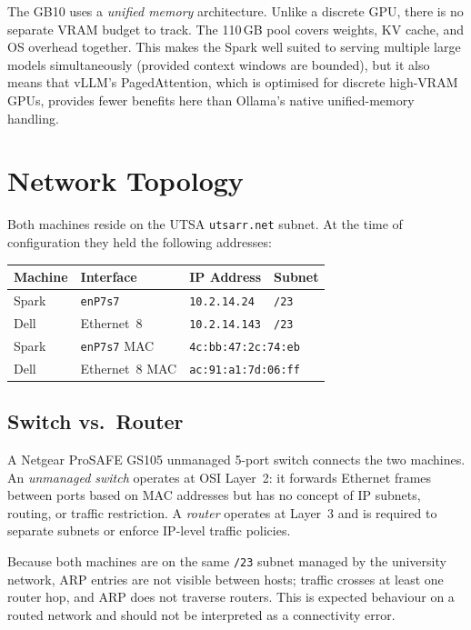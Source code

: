 \begin{warningbox}
The GB10 uses a \emph{unified memory} architecture. Unlike a discrete
GPU, there is no separate VRAM budget to track. The 110\,GB pool covers
weights, KV cache, and OS overhead together. This makes the Spark well
suited to serving multiple large models simultaneously (provided context
windows are bounded), but it also means that vLLM's PagedAttention,
which is optimised for discrete high-VRAM GPUs, provides fewer benefits
here than Ollama's native unified-memory handling.
\end{warningbox}

\section{Network Topology}
\label{sec:network}

Both machines reside on the UTSA \texttt{utsarr.net} subnet. At the time
of configuration they held the following addresses:

\begin{center}
\begin{tabular}{llll}
\toprule
Machine & Interface & IP Address & Subnet \\
\midrule
Spark   & \texttt{enP7s7} & \texttt{10.2.14.24}  & \texttt{/23} \\
Dell    & Ethernet~8      & \texttt{10.2.14.143} & \texttt{/23} \\
\midrule
Spark   & \texttt{enP7s7} MAC & \multicolumn{2}{l}{\texttt{4c:bb:47:2c:74:eb}} \\
Dell    & Ethernet~8 MAC      & \multicolumn{2}{l}{\texttt{ac:91:a1:7d:06:ff}} \\
\bottomrule
\end{tabular}
\end{center}

\subsection{Switch vs.\ Router}

A Netgear ProSAFE GS105 unmanaged 5-port switch connects the two
machines. An \emph{unmanaged switch} operates at OSI Layer~2: it
forwards Ethernet frames between ports based on MAC addresses but has no
concept of IP subnets, routing, or traffic restriction. A
\emph{router} operates at Layer~3 and is required to separate subnets or
enforce IP-level traffic policies.

Because both machines are on the same \texttt{/23} subnet managed by the
university network, ARP entries are not visible between hosts; traffic
crosses at least one router hop, and ARP does not traverse routers. This
is expected behaviour on a routed network and should not be interpreted
as a connectivity error.

